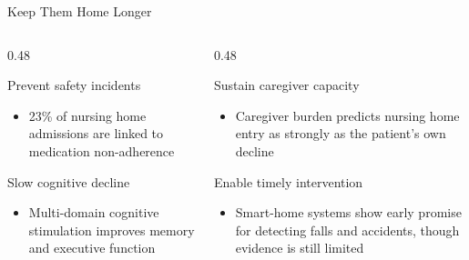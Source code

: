 \begin{frame}{Keep Them Home Longer}
	\begin{columns}[T,onlytextwidth]
		\begin{column}{0.48\textwidth}
			\begin{block}{Prevent safety incidents}
				\begin{itemize}
					\item 23\% of nursing home admissions are linked to medication non-adherence\cite{peterson2003}
				\end{itemize}
			\end{block}
			\begin{block}{Slow cognitive decline}
				\begin{itemize}
					\item Multi-domain cognitive stimulation improves memory and executive function\cite{zou2024}
				\end{itemize}
			\end{block}
		\end{column}
		\begin{column}{0.48\textwidth}
			\begin{block}{Sustain caregiver capacity}
				\begin{itemize}
					\item Caregiver burden predicts nursing home entry as strongly as the patient's own decline\cite{gaugler2010}
				\end{itemize}
			\end{block}
			\begin{block}{Enable timely intervention}
				\begin{itemize}
					\item Smart-home systems show early promise for detecting falls and accidents, though evidence is still limited\cite{moyle2021}
				\end{itemize}
			\end{block}
		\end{column}
	\end{columns}
\end{frame}
